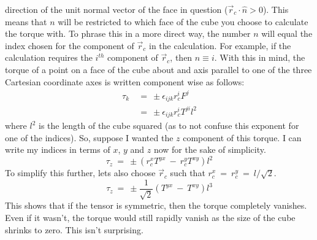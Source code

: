 direction of the unit normal vector of the face in question ($\vec{r}_c\cdot\hat{n}>0$).  This means that $n$ will be
restricted to which face of the cube you choose to calculate the torque with.  To phrase this in a more direct way,
the number $n$ will equal the index chosen for the component of $\vec{r}_c$ in the calculation.  For example, if the
calculation requires the $i^{th}$ component of $\vec{r}_c$, then $n\equiv i$.  With this in mind, the torque of a
point on a face of the cube about and axis parallel to one of the three Cartesian coordinate axes is written component
wise as follows:
\begin{equation}
  \begin{aligned}
    \tau_k\ &=\ \pm\epsilon_{ijk}r_c^iF^j \\
    &=\ \pm\epsilon_{ijk}r_c^iT^{ji}l^2
  \end{aligned}
\end{equation}
where $l^2$ is the length of the cube squared (as to not confuse this exponent for one of the indices).  So, suppose I
wanted the $z$ component of this torque.  I can write my indices in terms of $x$, $y$ and $z$ now for the sake of
simplicity.
\begin{equation}
  \tau_z\ =\ \pm\left (r_c^xT^{yx}\ -\ r_c^yT^{xy}\right )l^2
\end{equation}
To simplify this further, lets also choose $\vec{r}_c$ such that $r_c^x\ =\ r_c^y\ =\ l/\sqrt{2}$.
\begin{equation}
  \tau_z\ =\ \pm\frac{1}{\sqrt{2}}\left (T^{yx}\ -\ T^{xy}\right )l^3
\end{equation}
This shows that if the tensor is symmetric, then the torque completely vanishes.  Even if it wasn't, the torque would still
rapidly vanish as the size of the cube shrinks to zero.  This isn't surprising.  


